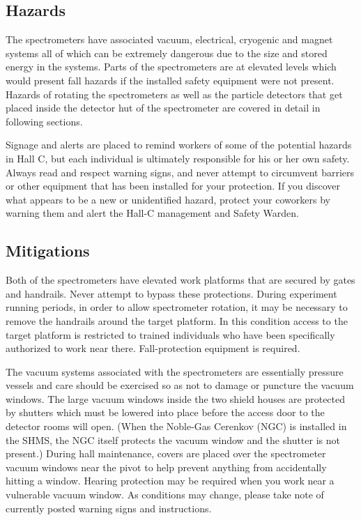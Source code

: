 \begin{safetyen}{0}{0}
\label{sec:spectrometer-safety}

\subsection{Hazards}

The spectrometers have associated vacuum, electrical, cryogenic and
magnet systems all of which can be extremely dangerous due to the size
and stored energy in the systems.
Parts of the spectrometers are at elevated levels which would present fall
hazards if the installed safety equipment were not present.
Hazards of rotating the
spectrometers as well as the particle detectors that get placed inside
the detector hut of the spectrometer are covered in detail in
following sections.

Signage and alerts are placed to remind workers of some of the potential hazards
in Hall C, but each individual is ultimately responsible for his or her own
safety. Always read and respect warning signs, and never attempt to
circumvent barriers or other equipment
that has been installed for your protection. If you discover what appears to be a
new or unidentified hazard, protect your coworkers by warning them
and alert the Hall-C management and Safety Warden.

\subsection{Mitigations}

Both of the spectrometers have elevated work platforms that are secured by
gates and handrails. Never attempt to bypass these protections. During experiment
running periods, in order to allow spectrometer rotation, it may be necessary to
remove the handrails around the target platform. In this condition access to the
target platform is restricted to trained individuals who have been specifically
authorized to work near there. Fall-protection equipment is required.

The vacuum systems associated with the spectrometers are essentially
pressure vessels and care should be exercised so as not to damage or puncture the
vacuum windows.   The large vacuum windows inside the two shield houses are protected
by shutters which must be lowered into place before the access door to the
detector rooms will open. (When the Noble-Gas Cerenkov (NGC) is installed in the SHMS,
the NGC itself protects the vacuum window and the shutter is not present.)
During hall maintenance, covers are placed over the spectrometer
vacuum windows near the pivot to help prevent anything from accidentally hitting
a window. Hearing protection may be required when you work near a vulnerable
vacuum window. As conditions may change, please take note of currently posted
warning signs and instructions.


\end{safetyen}
